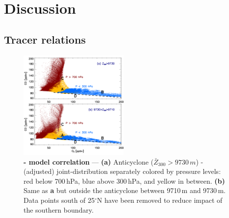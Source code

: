 \ifpdf
    \graphicspath{{Chapter_2006/figures/PNG/}{Chapter_2006/figures/PDF/}{Chapter_2006/figures/}}
\else
    \graphicspath{{Chapter_2006/figures/EPS/}{Chapter_2006/figures/}}
\fi

\newpage\section{Discussion}\label{sec:2006/discussion}

\subsection{Tracer relations}\label{ssec:2006/discuss/tracer}

	\begin{figure}
		\centering
		\vspace{-.3in}
		\begin{singlespacing}
		\includegraphics[width=0.48\textwidth]{tracer/tracer_correlations}
		\caption[- model correlation]{{\label{fig:2006/o3co}\small\textbf{-
		model correlation} --- \textbf{(a)} Anticyclone ($\bar{Z}_{300}>9730\,\unit{m}$) -(adjusted)
		joint-distribution separately colored by pressure levels: red below 700\,\unit{hPa}, blue above 300\,\unit{hPa}, and yellow in between. \textbf{(b)} Same as \textbf{a} but outside the anticyclone
		between 9710\,\unit{m} and 9730\,\unit{m}. Data points south of 25$^\circ$N have been removed to reduce impact
		of the southern boundary. \vspace{-.3in}}}
		\end{singlespacing}
	\end{figure}

